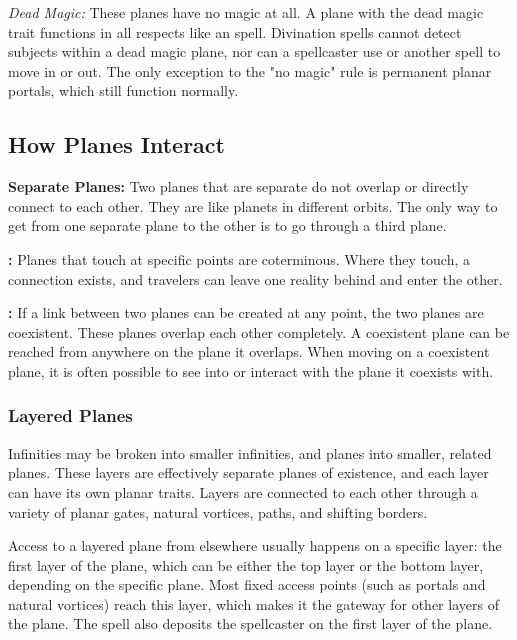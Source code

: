 \textit{Dead Magic:} These planes have no magic at all. A plane with the dead magic 
trait functions in all respects like an  spell. Divination 
spells cannot detect subjects within a dead magic plane, nor can a spellcaster 
use  or another spell to move in or out. The only exception to 
the "no magic" rule is permanent planar portals, which still function normally.

\subsection{How Planes Interact}

\textbf{Separate Planes:} Two planes that are separate do not overlap or directly 
connect to each other. They are like planets in different orbits. The only way 
to get from one separate plane to the other is to go through a third plane.

\textbf{:} Planes that touch at specific points are coterminous. 
Where they touch, a connection exists, and travelers can leave one reality behind 
and enter the other.

\textbf{:} If a link between two planes can be created at any 
point, the two planes are coexistent. These planes overlap each other completely. 
A coexistent plane can be reached from anywhere on the plane it overlaps. When 
moving on a coexistent plane, it is often possible to see into or interact with 
the plane it coexists with. 

\subsubsection{Layered Planes}

Infinities may be broken into smaller infinities, and planes into smaller, related 
planes. These layers are effectively separate planes of existence, and each layer 
can have its own planar traits. Layers are connected to each other through a variety 
of planar gates, natural vortices, paths, and shifting borders.

Access to a layered plane from elsewhere usually happens on a specific layer: the 
first layer of the plane, which can be either the top layer or the bottom layer, 
depending on the specific plane. Most fixed access points (such as portals and 
natural vortices) reach this layer, which makes it the gateway for other layers 
of the plane. The  spell also deposits the spellcaster on the 
first layer of the plane.

